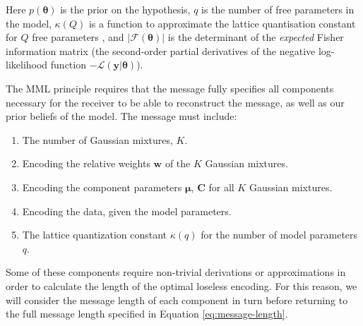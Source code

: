 \documentclass{aastex61}
\newcommand{\vect}[1]{\boldsymbol{\mathbf{#1}}}
\def\veccov{\vect{C}}
\def\vecmean{\vect{\mu}}
\def\vectheta{\vect{\theta}}
\def\weight{w}
\def\weights{\vect{\weight}}
\def\datum{y}
\def\data{\vect{\datum}}
\def\likelihood{\mathcal{L}}
\begin{document}
Here $p(\vectheta)$ is the prior on the hypothesis, $q$ is the number of free
parameters in the model, $\kappa\left(Q\right)$ is a function to approximate the lattice
quantisation constant for $Q$ free parameters \citep[e.g.,][]{Conway_1984}, 
and $|\mathcal{F}\left(\vectheta\right)|$ is the determinant of the 
\emph{expected} Fisher information matrix (the second-order partial 
derivatives of the negative log-likelihood function 
$-\likelihood(\data|\vectheta)$).







The MML principle requires that the message fully specifies all components
necessary for the receiver to be able to reconstruct the message, as well as
our prior beliefs of the model.
The message must include:



\begin{enumerate}
  \item The number of Gaussian mixtures, $K$.
  \item Encoding the relative weights $\weights$ of the $K$ Gaussian mixtures.
  \item Encoding the component parameters $\vecmean$, $\veccov$ for all $K$
        Gaussian mixtures.
  \item Encoding the data, given the model parameters.
  \item The lattice quantization constant $\kappa(q)$ for the number of model
        parameters $q$.
\end{enumerate}

Some of these components require non-trivial derivations or approximations in
order to calculate the length of the optimal loseless encoding. 
For this reason, we will consider the message length of each component in turn
before returning to the full message length specified in Equation \ref{eq:message-length}.
\end{document}
